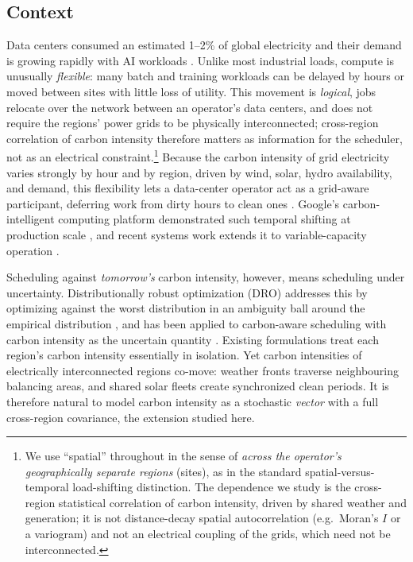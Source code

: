 \documentclass[12pt]{article}
\begin{document}
\subsection{Context}
Data centers consumed an estimated 1--2\% of global electricity and their demand is
growing rapidly with AI workloads \citep{iea2024}. Unlike most industrial loads,
compute is unusually \emph{flexible}: many batch and training workloads can be
delayed by hours or moved between sites with little loss of utility. This movement is
\emph{logical}, jobs relocate over the network between an operator's data centers, and
does not require the regions' power grids to be physically interconnected; cross-region
correlation of carbon intensity therefore matters as information for the scheduler, not
as an electrical constraint.\footnote{We use ``spatial'' throughout in the sense of
\emph{across the operator's geographically separate regions} (sites), as in the standard
spatial-versus-temporal load-shifting distinction. The dependence we study is the
cross-region statistical correlation of carbon intensity, driven by shared weather and
generation; it is not distance-decay spatial autocorrelation (e.g.\ Moran's $I$ or a
variogram) and not an electrical coupling of the grids, which need not be interconnected.}
Because the
carbon intensity of grid electricity varies strongly by hour and by region, driven by wind, solar, hydro availability, and demand, this flexibility lets a
data-center operator act as a grid-aware participant, deferring work from dirty
hours to clean ones \citep{radovanovic2022,wiesner2021}. Google's carbon-intelligent
computing platform demonstrated such temporal shifting at production scale
\citep{radovanovic2022}, and recent systems work extends it to variable-capacity
operation \citep{wijayawardana2025}.

Scheduling against \emph{tomorrow's} carbon intensity, however, means scheduling
under uncertainty. Distributionally robust optimization (DRO) addresses this by
optimizing against the worst distribution in an ambiguity ball around the empirical
distribution \citep{esfahani2018}, and has been applied to carbon-aware scheduling
with carbon intensity as the uncertain quantity \citep{hall2024}. Existing
formulations treat each region's carbon intensity essentially in isolation. Yet
carbon intensities of electrically interconnected regions co-move: weather fronts
traverse neighbouring balancing areas, and shared solar fleets create synchronized
clean periods. It is therefore natural to model carbon intensity as a stochastic
\emph{vector} with a full cross-region covariance, the extension studied here.
\end{document}
